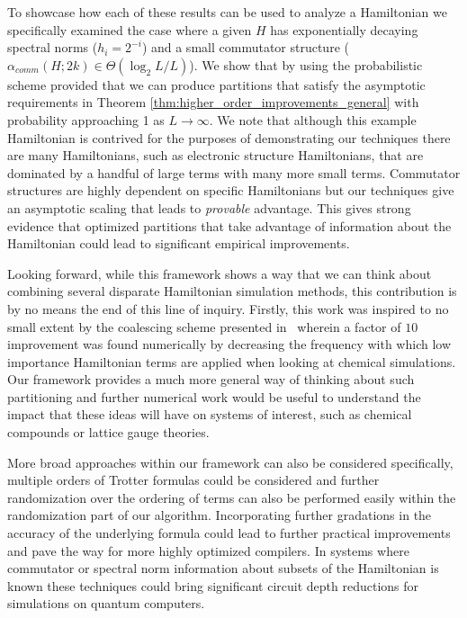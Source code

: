 To showcase how each of these results can be used to analyze a Hamiltonian we specifically examined the case where a given $H$ has exponentially decaying spectral norms ($h_i = 2^{-i}$) and a small commutator structure ($\alpha_{comm}(H; 2k) \in \Theta (\log_2 L / L)$). We show that by using the probabilistic scheme provided that we can produce partitions that satisfy the asymptotic requirements in Theorem \ref{thm:higher_order_improvements_general} with probability approaching 1 as $L \to \infty$. We note that although this example Hamiltonian is contrived for the purposes of demonstrating our techniques there are many Hamiltonians, such as electronic structure Hamiltonians, that are dominated by a handful of large terms with many more  small terms. Commutator structures are highly dependent on specific Hamiltonians but our techniques give an asymptotic scaling that leads to \emph{provable} advantage. This gives strong evidence that optimized partitions that take advantage of information about the Hamiltonian could lead to significant empirical improvements.


Looking forward, while this framework shows a way that we can think about combining several disparate Hamiltonian simulation methods, this contribution is by no means the end of this line of inquiry.  Firstly, this work was inspired to no small extent by the coalescing scheme presented in~\cite{coalescing_con_wiebe} wherein a factor of $10$ improvement was found numerically by decreasing the frequency with which low importance Hamiltonian terms are applied when looking at chemical simulations.  Our framework provides a much more general way of thinking about such partitioning and further numerical work would be useful to understand the impact that these ideas will have on systems of interest, such as chemical compounds or lattice gauge theories.

More broad approaches within our framework can also be considered specifically, multiple orders of Trotter formulas could be considered and further randomization over the ordering of terms can also be performed easily within the randomization part of our algorithm.  Incorporating further gradations in the accuracy of the underlying formula could lead to further practical improvements and pave the way for more highly optimized compilers. In systems where commutator or spectral norm information about subsets of the Hamiltonian is known these techniques could bring significant circuit depth reductions for simulations on quantum computers.


% 
% 

